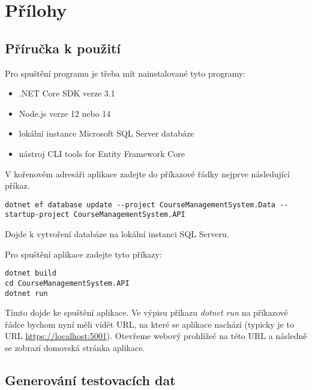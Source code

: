 \documentclass[12pt,a4paper]{report}
\let\openright=\clearpage
\begin{document}
\chapter{Přílohy}

\section{Příručka k použití}

Pro spuštění programu je třeba mít nainstalované tyto programy:
\begin{itemize}
	\item .NET Core SDK verze 3.1
	\item Node.js verze 12 nebo 14
	\item lokální instance Microsoft SQL Server databáze
	\item nástroj CLI tools for Entity Framework Core
\end{itemize}

V kořenovém adresáři aplikace zadejte do příkazové řádky nejprve následující příkaz.

\begin{lstlisting}
dotnet ef database update --project CourseManagementSystem.Data --startup-project CourseManagementSystem.API
\end{lstlisting}

Dojde k vytvoření databáze na lokální instanci SQL Serveru.

Pro spuštění aplikace zadejte tyto příkazy:
\begin{lstlisting}
dotnet build
cd CourseManagementSystem.API
dotnet run
\end{lstlisting}

Tímto dojde ke spuštění aplikace. Ve výpisu příkazu \textit{dotnet run} na příkazové řádce bychom nyní měli vidět URL, na které se aplikace nachází (typicky je to URL \url{https://localhost:5001}). Otevřeme webový prohlížeč na této URL a následně se zobrazí domovská stránka aplikace.

\section{Generování testovacích dat}



\openright
\end{document}
